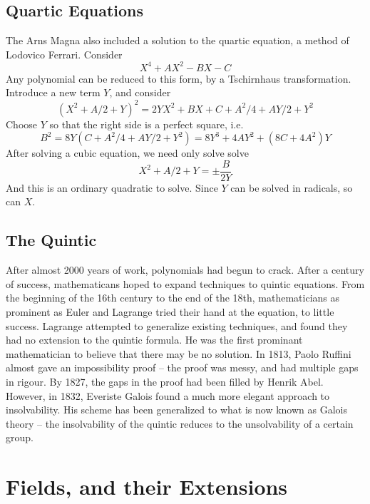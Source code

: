 \section{Quartic Equations}

The Arns Magna also included a solution to the quartic equation, a method of Lodovico Ferrari. Consider
%
\[ X^4 + AX^2 - BX - C \]
%
Any polynomial can be reduced to this form, by a Tschirnhaus transformation. Introduce a new term $Y$, and consider
%
\[ (X^2 + A/2 + Y)^2 = 2YX^2 + BX + C + A^2/4 + AY/2 + Y^2 \]
%
Choose $Y$ so that the right side is a perfect square, i.e.
%
\[ B^2 = 8Y(C + A^2/4 + AY/2 + Y^2) = 8Y^3 + 4AY^2 + (8C + 4A^2)Y \]
%
After solving a cubic equation, we need only solve solve
%
\[ X^2 + A/2 + Y = \pm \frac{B}{2Y} \]
%
And this is an ordinary quadratic to solve. Since $Y$ can be solved in radicals, so can $X$.

\section{The Quintic}

After almost 2000 years of work, polynomials had begun to crack. After a century of success, mathematicans hoped to expand techniques to quintic equations. From the beginning of the 16th century to the end of the 18th, mathematicians as prominent as Euler and Lagrange tried their hand at the equation, to little success. Lagrange attempted to generalize existing techniques, and found they had no extension to the quintic formula. He was the first prominant mathematician to believe that there may be no solution. In 1813, Paolo Ruffini almost gave an impossibility proof -- the proof was messy, and had multiple gaps in rigour. By 1827, the gaps in the proof had been filled by Henrik Abel. However, in 1832, Everiste Galois found a much more elegant approach to insolvability. His scheme has been generalized to what is now known as Galois theory -- the insolvability of the quintic reduces to the unsolvability of a certain group.

\chapter{Fields, and their Extensions}

